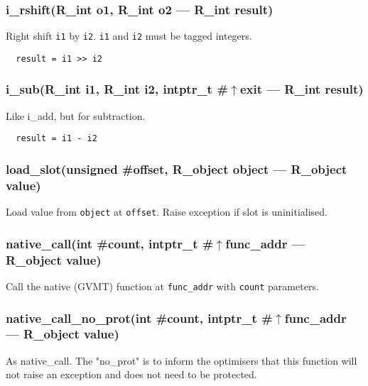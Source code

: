 \subsubsection{i\_rshift(R\_int o1, R\_int o2 --- R\_int result)}
\vspace{-1em}Right shift \texttt{i1} by \texttt{i2}. \texttt{i1} and \texttt{i2} must be tagged integers. \vspace{-1em}\begin{verbatim}
  result = i1 >> i2
\end{verbatim}
\vspace{-1em}\vspace{-1em}
\subsubsection{i\_sub(R\_int i1, R\_int i2, intptr\_t \#$\uparrow$exit --- R\_int result)}
\vspace{-1em}Like i\_add, but for subtraction. \vspace{-1em}\begin{verbatim}
  result = i1 - i2
\end{verbatim}
\vspace{-1em}\vspace{-1em}
\subsubsection{load\_slot(unsigned \#offset, R\_object object --- R\_object value)}
\vspace{-1em}Load value from \texttt{object} at \texttt{offset}. Raise exception if slot is uninitialised. \vspace{-1em}
\subsubsection{native\_call(int \#count, intptr\_t \#$\uparrow$func\_addr --- R\_object value)}
\vspace{-1em}Call the native (GVMT) function at \texttt{func\_addr} with \texttt{count} parameters.  \vspace{-1em}
\subsubsection{native\_call\_no\_prot(int \#count, intptr\_t \#$\uparrow$func\_addr --- R\_object value)}
\vspace{-1em}As native\_call. The "no\_prot" is to inform the optimisers that this function will not raise an exception and does not need to be protected. \vspace{-1em}
